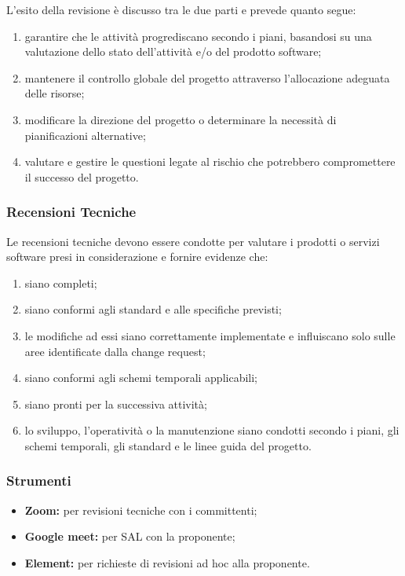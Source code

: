 L'esito della revisione è discusso tra le due parti e prevede quanto segue:

\begin{enumerate}
    \item
        garantire che le attività progrediscano secondo i piani, basandosi su una valutazione dello stato dell'attività e/o del prodotto software;
    \item
        mantenere il controllo globale del progetto attraverso l'allocazione adeguata delle risorse;
    \item
        modificare la direzione del progetto o determinare la necessità di pianificazioni alternative;
    \item
        valutare e gestire le questioni legate al rischio che potrebbero compromettere il successo del progetto.
\end{enumerate}

\subsubsection{Recensioni Tecniche}
Le recensioni tecniche devono essere condotte per valutare i prodotti o servizi software presi in considerazione e fornire evidenze che:

\begin{enumerate}
    \item
        siano completi;
    \item
        siano conformi agli standard e alle specifiche previsti;
    \item
        le modifiche ad essi siano correttamente implementate e influiscano solo sulle aree identificate dalla change request;
    \item
        siano conformi agli schemi temporali applicabili;
    \item
        siano pronti per la successiva attività;
    \item
        lo sviluppo, l'operatività o la manutenzione siano condotti secondo i piani, gli schemi temporali, gli standard e le linee guida del progetto.
\end{enumerate}

\subsubsection{Strumenti}

\begin{itemize}
    \item \textbf{Zoom:} 
        per revisioni tecniche con i committenti;
    \item \textbf{Google meet:} 
        per SAL con la proponente; 
    \item \textbf{Element:} 
        per richieste di revisioni ad hoc alla proponente.
\end{itemize}